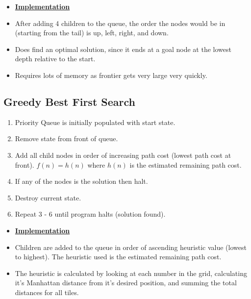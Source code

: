 \documentclass[12pt]{article}
\begin{document}
\begin{itemize}
	\item \textbf{\underline{Implementation}}
	\item After adding 4 children to the queue, the order the nodes would be in (starting from the tail) is up, left, right, and down.
	\item Does find an optimal solution, since it ends at a goal node at the lowest depth relative to the start.
	\item Requires lots of memory as frontier gets very large very quickly.
\end{itemize}

\subsection{Greedy Best First Search}
\begin{enumerate}
	\item Priority Queue is initially populated with start state.
	\item Remove state from front of queue.
	\item Add all child nodes in order of increasing path cost (lowest path cost at front). $f(n) = h(n)$ where $h(n)$ is the estimated remaining path cost.
	\item If any of the nodes is the solution then halt.
	\item Destroy current state.
	\item Repeat 3 - 6 until program halts (solution found).
\end{enumerate}

\begin{itemize}
	\item \textbf{\underline{Implementation}}
	\item Children are added to the queue in order of ascending heuristic value (lowest to highest). The heuristic used is the estimated remaining path cost.
	\item The heuristic is calculated by looking at each number in the grid, calculating it's Manhattan distance from it's desired position, and summing the total distances for all tiles. 
\end{itemize}
\end{document}
